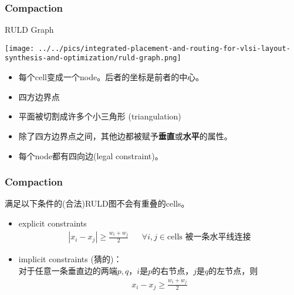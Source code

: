 \documentclass[UTF8,lualatex]{ctexbeamer}
\newcommand{\cells}{\text{cells}}
\begin{document}
\begin{frame}
    \frametitle{Compaction}
    
    \begin{exampleblock}{RULD Graph}
        \begin{center}
            \texttt{[image: ../../pics/integrated-placement-and-routing-for-vlsi-layout-synthesis-and-optimization/ruld-graph.png]}
        \end{center}
        \begin{itemize}
            \item 每个cell变成一个node。后者的坐标是前者的中心。
            \item 四方边界点
            \item 平面被切割成许多个小三角形 (triangulation)
            \item 除了四方边界点之间，其他边都被赋予\textbf{垂直}或\textbf{水平}的属性。
            \item 每个node都有四向边(legal constraint)。
        \end{itemize}
    \end{exampleblock}
\end{frame}

\begin{frame}
    \frametitle{Compaction}

    \begin{theorem}
        满足以下条件的(合法)RULD图不会有重叠的cells。
        \begin{itemize}
            \item explicit constraints 
                \begin{align*}
                    \left|x_i-x_j\right|\geqslant\frac{w_i+w_j}{2} &&\forall i,j\in\cells\text{~被一条水平线连接}
                \end{align*}
            \item implicit constraints (猜的)：
                \\
                对于任意一条垂直边的两端$p,q$，$i$是$p$的右节点，$j$是$q$的左节点，则
                \begin{align*}
                    x_i - x_j \geqslant \frac{w_i + w_j}{2}
                \end{align*}
        \end{itemize}
    \end{theorem}
\end{frame}
\end{document}
